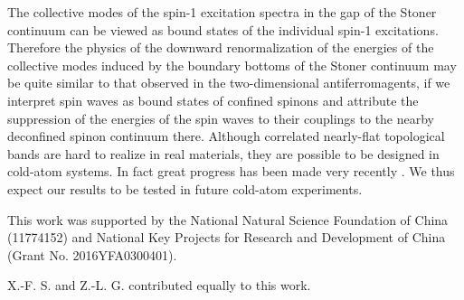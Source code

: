\documentclass[amsmath,superscriptaddress,showpacs,aps,prb,twocolumn]{revtex4-1}
\begin{document}
\par The collective modes of the spin-1 excitation spectra in the gap of the Stoner continuum can be viewed as bound states of the individual spin-1 excitations. Therefore the physics of the downward renormalization of the energies of the collective modes induced by the boundary bottoms of the Stoner continuum may be quite similar to that observed in the two-dimensional antiferromagents, if we interpret spin waves as bound states of confined spinons and attribute the suppression of the energies of the spin waves to their couplings to the nearby deconfined spinon continuum there\cite{ZFSMC_PRL2006,TS_PRL2013,DMCNTPEMIR_NP2015,SQCCMS_PRX2017,YWDYL_arXiv2018}. Although correlated nearly-flat topological bands are hard to realize in real materials, they are possible to be designed in cold-atom systems. In fact great progress has been made very recently \cite{LCJPS_N2009,AALBPB_PRL2013,MSKBK_PRL2013,JMDLUGE_N2014}. We thus expect our results to be tested in future cold-atom experiments.

\begin{acknowledgments}
\par This work was supported by the National Natural Science Foundation of China (11774152) and National Key Projects for Research and Development of China (Grant No. 2016YFA0300401).
\par X.-F. S. and Z.-L. G. contributed equally to this work.
\end{acknowledgments}


\end{document}
